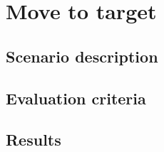 


\section{Move to target}

\subsection{Scenario description}

\subsection{Evaluation criteria}

\subsection{Results}
